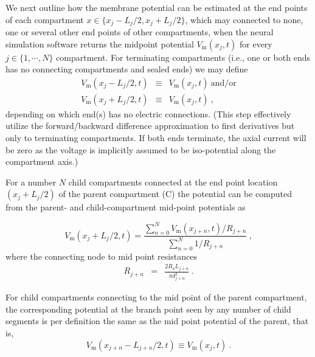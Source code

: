 We next outline how the membrane potential can be estimated at the end points of each compartment $x \in \{x_j-L_j/2, x_j+L_j/2\}$,
which may connected to none, one or several other end points of other compartments,
when the neural simulation software returns the midpoint potential $V_\mathrm{m}(x_j, t)$ for every $j \in \{1, \cdots, N \}$ compartment.
For terminating compartments (i.e., one or both ends has no connecting compartments and sealed ends) we may define
%
\begin{eqnarray}
V_\mathrm{m}(x_j - L_j/2, t) &\equiv& V_\mathrm{m}(x_j, t)~\mathrm{and/or} \nonumber \\
V_\mathrm{m}(x_j + L_j/2, t) &\equiv& V_\mathrm{m}(x_j, t)~, \nonumber
\end{eqnarray}
%
depending on which end(s) has no electric connections.
(This step effectively utilize the forward/backward difference approximation to first derivatives but only to terminating compartments.
If both ends terminate, the axial current will be zero as the voltage is implicitly assumed to be iso-potential along the compartment axis.)

For a number $N$ child compartments connected at the end point location $(x_j+L_j/2)$ of the parent compartment (C) the potential can be computed from the parent- and child-compartment mid-point potentials as \cite{Hagen2018}

\begin{equation}
V_\mathrm{m}(x_j+L_j/2, t) = \frac{\sum_{n=0}^N V_\mathrm{m}(x_{j+n}, t) / R_{j+n}}{\sum_{n=0}^N 1 / R_{j+n}}~,
\label{eq:LFPy_V_connect_point}
\end{equation}
%
where the connecting node to mid point resistances
%
\begin{eqnarray}
R_{j+n} &=& \frac{2 R_\mathrm{a}L_{j+n}}{\pi d_{j+n}^2} ~.
\end{eqnarray}

For child compartments connecting to the mid point of the parent compartment,
the corresponding potential at the branch point seen by any number of child segments is per definition the same as the mid point potential of the parent, that is,
\begin{equation}
V_\mathrm{m}(x_{j+n}-L_{j+n} / 2, t) \equiv V_\mathrm{m}(x_j, t) ~.
\end{equation}

